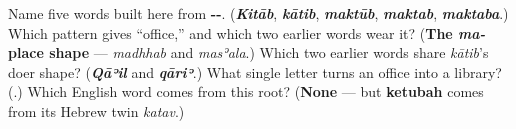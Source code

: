 \begin{tcolorbox}[breakable,colback=teal!4,colframe=teal!35!black,title={Before you move on}]
Name five words built here from \textbf{--}. (\emph{\textbf{Kitāb}}, \emph{\textbf{kātib}}, \emph{\textbf{maktūb}}, \emph{\textbf{maktab}}, \emph{\textbf{maktaba}}.) Which pattern gives \textquotedblleft{}office,\textquotedblright{} and which two earlier words wear it? (\textbf{The \emph{ma-} place shape} — \emph{madhhab} and \emph{masʾala}.) Which two earlier words share \emph{kātib}'s doer shape? (\emph{\textbf{Qāʾil}} and \emph{\textbf{qāriʾ}}.) What single letter turns an office into a library? (\textbf{}.) Which English word comes from this root? (\textbf{None} — but \textbf{ketubah} comes from its Hebrew twin \emph{katav}.)
\end{tcolorbox}
